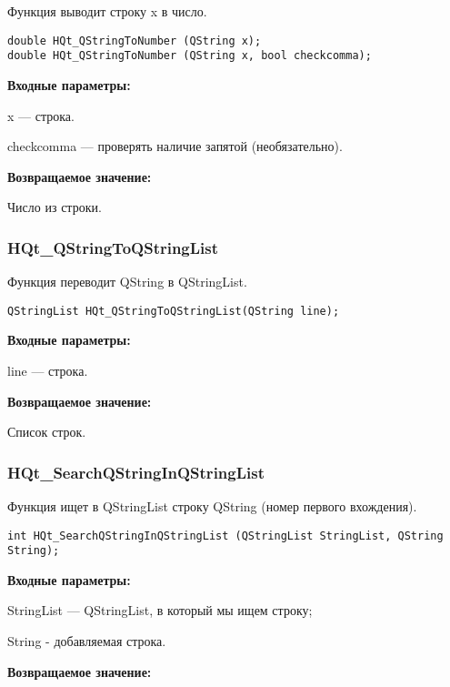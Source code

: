 \documentclass[a4paper,12pt]{article}
\begin{document}
Функция выводит строку x в число.


\begin{lstlisting}[label=code_syntax_HQt_QStringToNumber,caption=Синтаксис]
double HQt_QStringToNumber (QString x);
double HQt_QStringToNumber (QString x, bool checkcomma);
\end{lstlisting}

\textbf{Входные параметры:}

x --- строка.

checkcomma --- проверять наличие запятой (необязательно).

\textbf{Возвращаемое значение:}
 
Число из строки.


\subsubsection{HQt\_QStringToQStringList}\label{HQt_QStringToQStringList}

Функция переводит QString в QStringList.


\begin{lstlisting}[label=code_syntax_HQt_QStringToQStringList,caption=Синтаксис]
QStringList HQt_QStringToQStringList(QString line);
\end{lstlisting}

\textbf{Входные параметры:}
 
line --- строка.

\textbf{Возвращаемое значение:}

Список строк.


\subsubsection{HQt\_SearchQStringInQStringList}\label{HQt_SearchQStringInQStringList}

Функция ищет в QStringList строку QString (номер первого вхождения).


\begin{lstlisting}[label=code_syntax_HQt_SearchQStringInQStringList,caption=Синтаксис]
int HQt_SearchQStringInQStringList (QStringList StringList, QString String);
\end{lstlisting}

\textbf{Входные параметры:}
 
StringList --- QStringList, в который мы ищем строку;

String - добавляемая строка.

\textbf{Возвращаемое значение:}
\end{document}
